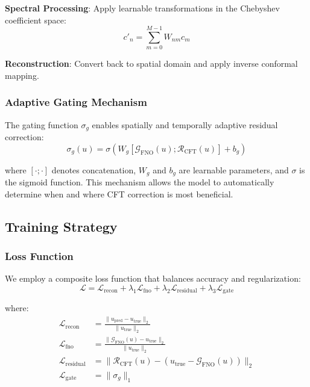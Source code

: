 \documentclass[11pt]{article}
\begin{document}
\textbf{Spectral Processing}: Apply learnable transformations in the Chebyshev coefficient space:
\begin{equation}
c'_n = \sum_{m=0}^{M-1} W_{nm} c_m
\end{equation}

\textbf{Reconstruction}: Convert back to spatial domain and apply inverse conformal mapping.

\subsubsection{Adaptive Gating Mechanism}

The gating function $\sigma_g$ enables spatially and temporally adaptive residual correction:
\begin{equation}
\sigma_g(u) = \sigma(W_g[\mathcal{G}_{\text{FNO}}(u); \mathcal{R}_{\text{CFT}}(u)] + b_g)
\end{equation}

where $[\cdot; \cdot]$ denotes concatenation, $W_g$ and $b_g$ are learnable parameters, and $\sigma$ is the sigmoid function. This mechanism allows the model to automatically determine when and where CFT correction is most beneficial.

\subsection{Training Strategy}

\subsubsection{Loss Function}

We employ a composite loss function that balances accuracy and regularization:
\begin{equation}
\mathcal{L} = \mathcal{L}_{\text{recon}} + \lambda_1 \mathcal{L}_{\text{fno}} + \lambda_2 \mathcal{L}_{\text{residual}} + \lambda_3 \mathcal{L}_{\text{gate}}
\end{equation}

where:
\begin{align}
\mathcal{L}_{\text{recon}} &= \frac{\|u_{\text{pred}} - u_{\text{true}}\|_2}{\|u_{\text{true}}\|_2} \\
\mathcal{L}_{\text{fno}} &= \frac{\|\mathcal{G}_{\text{FNO}}(u) - u_{\text{true}}\|_2}{\|u_{\text{true}}\|_2} \\
\mathcal{L}_{\text{residual}} &= \|\mathcal{R}_{\text{CFT}}(u) - (u_{\text{true}} - \mathcal{G}_{\text{FNO}}(u))\|_2 \\
\mathcal{L}_{\text{gate}} &= \|\sigma_g\|_1
\end{align}
\end{document}
